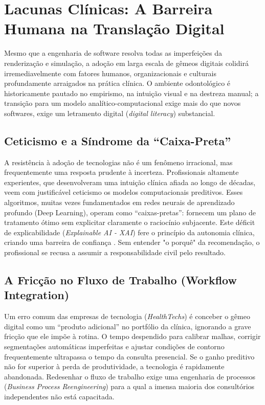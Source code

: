 \section{Lacunas Clínicas: A Barreira Humana na Translação Digital}

Mesmo que a engenharia de software resolva todas as imperfeições da renderização e simulação, a adoção em larga escala de gêmeos digitais colidirá irremediavelmente com fatores humanos, organizacionais e culturais profundamente arraigados na prática clínica. O ambiente odontológico é historicamente pautado no empirismo, na intuição visual e na destreza manual; a transição para um modelo analítico-computacional exige mais do que novos softwares, exige um letramento digital (\textit{digital literacy}) substancial.

\subsection{Ceticismo e a Síndrome da ``Caixa-Preta''}

A resistência à adoção de tecnologias não é um fenômeno irracional, mas frequentemente uma resposta prudente à incerteza. Profissionais altamente experientes, que desenvolveram uma intuição clínica afiada ao longo de décadas, veem com justificável ceticismo os modelos computacionais preditivos. Esses algoritmos, muitas vezes fundamentados em redes neurais de aprendizado profundo (Deep Learning), operam como ``caixas-pretas'': fornecem um plano de tratamento ótimo sem explicitar claramente o raciocínio subjacente. Este déficit de explicabilidade (\textit{Explainable AI - XAI}) fere o princípio da autonomia clínica, criando uma barreira de confiança \cite{mdpi2025digital}. Sem entender "o porquê" da recomendação, o profissional se recusa a assumir a responsabilidade civil pelo resultado.

\subsection{A Fricção no Fluxo de Trabalho (Workflow Integration)}

Um erro comum das empresas de tecnologia (\textit{HealthTechs}) é conceber o gêmeo digital como um ``produto adicional'' no portfólio da clínica, ignorando a grave fricção que ele impõe à rotina. O tempo despendido para calibrar malhas, corrigir segmentações automáticas imperfeitas e ajustar condições de contorno frequentemente ultrapassa o tempo da consulta presencial. Se o ganho preditivo não for superior à perda de produtividade, a tecnologia é rapidamente abandonada. Redesenhar o fluxo de trabalho exige uma engenharia de processos (\textit{Business Process Reengineering}) para a qual a imensa maioria dos consultórios independentes não está capacitada.

